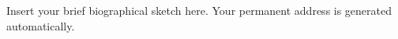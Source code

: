 \documentclass[11pt]{afthesis}
\begin{document}
	
	
	
	\begin{vita}
		Insert your brief biographical sketch here. Your permanent
		address is generated automatically.
	\end{vita}
	
	
\end{document}
